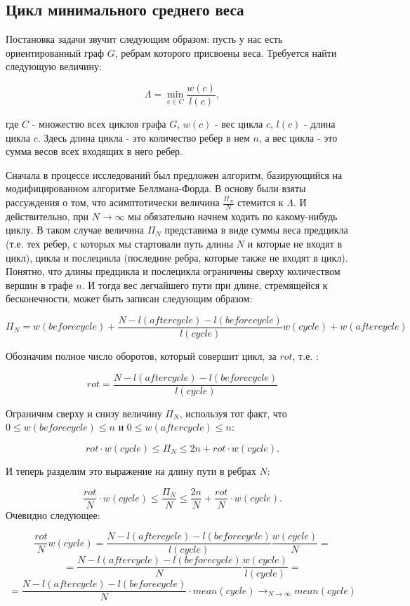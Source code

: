 \documentclass[a4paper,12pt]{extarticle}
\theoremstyle{plain} %
\begin{document}
\begin{large}
\subsection{Цикл минимального среднего веса}

Постановка задачи звучит следующим образом: пусть у нас есть ориентированный граф $G$, ребрам которого присвоены веса. Требуется найти следующую величину:

$$\Lambda = \min _{c \in C} \frac{w(c)}{l(c)},$$

где $C$ - множество всех циклов графа $G$, $w(c)$ - вес цикла $c$, $l(c)$ - длина цикла $c$. Здесь длина цикла - это количество ребер в нем $n$, а вес цикла - это сумма весов всех входящих в него ребер.

Сначала в процессе исследований был предложен алгоритм, базирующийся на модифицированном алгоритме Беллмана-Форда. В основу были взяты рассуждения о том, что асимптотически величина $\frac{\Pi_N}{N}$ стемится к $\Lambda$.  И действительно, при $N \rightarrow \infty$ мы обязательно начнем ходить по какому-нибудь циклу. В таком случае величина $\Pi_N$ представима в виде суммы веса предцикла (т.е. тех ребер, с которых мы стартовали путь длины $N$ и которые не входят в цикл), цикла и послецикла (последние ребра, которые также не входят в цикл). Понятно, что длины предцикла и послецикла ограничены сверху количеством вершин в графе $n$. И тогда вес легчайшего пути при длине, стремящейся к бесконечности, может быть записан следующим образом:

$$\Pi_N = w(beforecycle) + \frac{N - l(aftercycle) - l(beforecycle)}{l(cycle)}w(cycle) + w(aftercycle)$$

Обозначим полное число оборотов, который совершит цикл, за $rot$, т.е. :

$$rot =  \frac{N - l(aftercycle) - l(beforecycle)}{l(cycle)}$$

Ограничим сверху и снизу величину $\Pi_N$, используя тот факт, что $0 \le w(beforecycle) \le n$ и $0 \le w(aftercycle) \le n$:

$$rot \cdot w(cycle) \le \Pi_N \le 2n + rot \cdot w(cycle).$$

И теперь разделим это выражение на длину пути в ребрах $N$:

\begin{equation}\label{eq:pi_divided_N}
\frac{rot}{N} \cdot w(cycle) \le \frac{\Pi_N}{N} \le \frac{2n}{N} + \frac{rot}{N} \cdot w(cycle).\end{equation}
Очевидно следующее:

$$\frac{rot}{N} w(cycle) = \frac{N - l(aftercycle) - l(beforecycle)}{l(cycle)}\frac{w(cycle)}{N}=$$
$$=\frac{N - l(aftercycle) - l(beforecycle)}{N}\frac{w(cycle)}{l(cycle)} =$$
$$= \frac{N - l(aftercycle) - l(beforecycle)}{N} \cdot mean(cycle) \rightarrow_{N \rightarrow \infty} mean(cycle)$$


\end{large}
\end{document}
